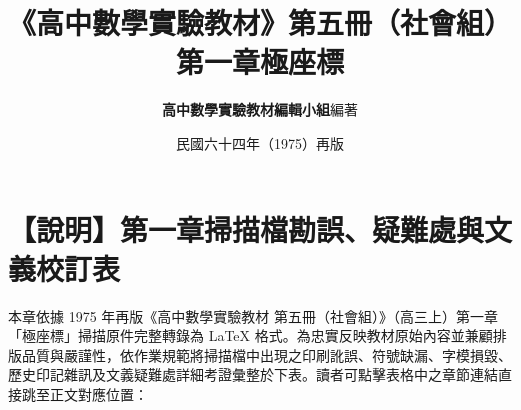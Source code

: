 \documentclass[a4paper,12pt,twoside]{article}
\title{\LARGE\textbf{《高中數學實驗教材》第五冊（社會組）}\\[0.5em] \Large\textbf{第一章\quad 極座標}}
\author{\textbf{高中數學實驗教材編輯小組}\quad 編著}
\date{民國六十四年（1975）再版}
\begin{document}
\maketitle
\thispagestyle{firstpage}

\section*{【說明】第一章掃描檔勘誤、疑難處與文義校訂表}
\label{sec:errata_notes_b5_ch1}
\label{sec:current_errata}

本章依據 1975 年再版《高中數學實驗教材 第五冊（社會組）》（高三上）第一章「極座標」掃描原件完整轉錄為 \LaTeX{} 格式。為忠實反映教材原始內容並兼顧排版品質與嚴謹性，依作業規範將掃描檔中出現之印刷訛誤、符號缺漏、字模損毀、歷史印記雜訊及文義疑難處詳細考證彙整於下表。讀者可點擊表格中之章節連結直接跳至正文對應位置：
\end{document}
